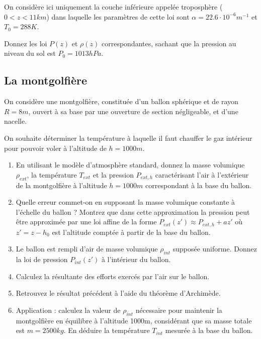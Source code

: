 On considère ici uniquement la couche inférieure appelée troposphère ($0<z<11km$) dans laquelle
les paramètres de cette loi sont  $\alpha = 22.6 \cdot 10^{-6} m^{-1}$ et $T_0 = 288 K$.  

Donnez les loi $P(z)$ et $\rho(z)$ correspondantes, sachant que la pression au niveau du sol
est $P_0 = 1013 hPa$.

\subsection{La montgolfière}

On considère une montgolfière, constituée d'un ballon sphérique et de 
rayon $R = 8m$, ouvert à sa base par une ouverture de section négligeable, et d'une nacelle.

On souhaite déterminer la température à laquelle il faut chauffer le gaz intérieur
pour pouvoir voler à l'altitude de $h=1000m$.

\begin{enumerate}

\item En utilisant le modèle d'atmosphère standard, donnez la masse volumique 
$\rho_{ext}$, la température $T_{ext}$ et la pression $P_{ext,h}$ caractérisant l'air à l'extérieur 
de la montgolfière à l'altitude $h = 1000m$ correspondant à la base du ballon.

\item
Quelle erreur commet-on en supposant la masse volumique constante à l'échelle du ballon ? 
Montrez que dans cette approximation la pression peut être approximée par une loi affine
de la forme $P_{ext}(z') \approx P_{ext,h}+a z'$ où $z' = z-h_0$ est l'altitude comptée à partir
de la base du ballon.


\item Le ballon est rempli d'air de masse volumique $\rho_{int}$ supposée uniforme.
Donnez la loi de pression $P_{int}(z')$ à l'intérieur du ballon.

\item Calculez la résultante des efforts exercés par l'air sur le ballon.

\item Retrouvez le résultat précédent à l'aide du théorème d'Archimède.

\item Application : calculez la valeur de $\rho_{int}$ nécessaire pour 
maintenir la montgolfière en équilibre à l'altitude 1000m, considérant que 
sa masse totale est $m=2500kg$. En déduire la température $T_{int}$
mesurée à la base du ballon.

\end{enumerate} 




